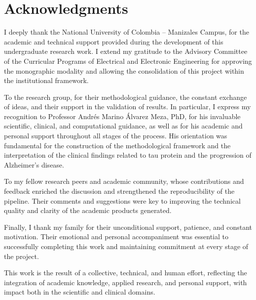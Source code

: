 \documentclass[12pt,a4paper]{article}
\begin{document}
\section{Acknowledgments}

I deeply thank the National University of Colombia – Manizales Campus, for the academic and technical support provided during the development of this undergraduate research work. I extend my gratitude to the Advisory Committee of the Curricular Programs of Electrical and Electronic Engineering for approving the monographic modality and allowing the consolidation of this project within the institutional framework.

To the research group, for their methodological guidance, the constant exchange of ideas, and their support in the validation of results. In particular, I express my recognition to Professor Andrés Marino Álvarez Meza, PhD, for his invaluable scientific, clinical, and computational guidance, as well as for his academic and personal support throughout all stages of the process. His orientation was fundamental for the construction of the methodological framework and the interpretation of the clinical findings related to tau protein and the progression of Alzheimer’s disease.

To my fellow research peers and academic community, whose contributions and feedback enriched the discussion and strengthened the reproducibility of the pipeline. Their comments and suggestions were key to improving the technical quality and clarity of the academic products generated.

Finally, I thank my family for their unconditional support, patience, and constant motivation. Their emotional and personal accompaniment was essential to successfully completing this work and maintaining commitment at every stage of the project.

This work is the result of a collective, technical, and human effort, reflecting the integration of academic knowledge, applied research, and personal support, with impact both in the scientific and clinical domains.


\printbibliography
\end{document}
